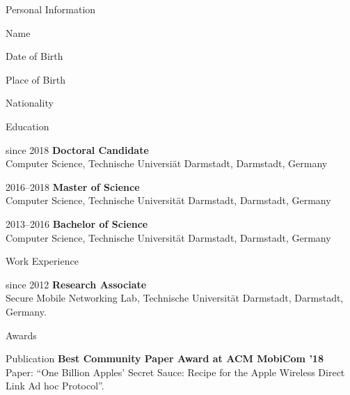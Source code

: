 
\label{ch:CurriculumVitae}

\begin{cv}{}

\renewcommand*{\cvlistheadingfont}{\spacedlowsmallcaps} %
\renewcommand*{\cvlabelfont}{\itshape}
\setlength\cvlabelwidth{60pt}

\begin{cvlist}{{Personal Information}}
    \item[Name] \myName
    \item[Date of Birth] \myBirthDate
    \item[Place of Birth] \myBirthPlace
    \item[Nationality] \myNationality
\end{cvlist}


\begin{cvlist}{{Education}}

\item[since 2018] \textbf{Doctoral Candidate} \\
Computer Science, Technische Universiät Darmstadt, Darmstadt, Germany

\item[2016--2018] \textbf{Master of Science} \\
Computer Science, Technische Universität Darmstadt, Darmstadt, Germany

\item[2013--2016] \textbf{Bachelor of Science} \\
Computer Science, Technische Universität Darmstadt, Darmstadt, Germany

\end{cvlist}


\begin{cvlist}{{Work Experience}}

\item[since 2012] \textbf{Research Associate} \\
Secure Mobile Networking Lab, Technische Universität Darmstadt, Darmstadt, Germany.

\end{cvlist}


\begin{cvlist}{{Awards}}

\item[Publication] \textbf{Best Community Paper Award at ACM MobiCom '18} \\
Paper: \enquote{One Billion Apples’ Secret Sauce: Recipe for the Apple Wireless Direct Link Ad hoc Protocol}.


\end{cvlist}
\end{cv}
